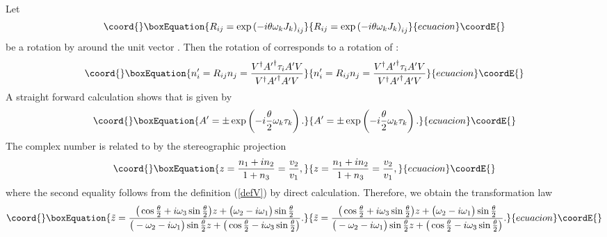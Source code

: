 \documentclass[a4paper,12pt]{article}
\begin{document}
Let
%
\begin{equation}\coord{}\boxEquation{
R_{ij} = \exp\left(-i \theta \omega_k J_k \right)_{ij}
}{
R_{ij} = \exp\left(-i \theta \omega_k J_k \right)_{ij}
}{ecuacion}\coordE{}\end{equation}
%
be a rotation by \myHighlight{$\theta$}\coordHE{} around the unit vector \coordHE{}. Then the 
rotation of \coordHE{} corresponds to a \coordHE{} rotation \coordHE{} of \coordHE{}: 
%
\begin{equation}\coord{}\boxEquation{
n_i^\prime = R_{ij} n_j 
= \frac{V^\dagger {A^\prime}^\dagger \tau_i A^\prime V}{V^\dagger 
{A^\prime}^\dagger A^\prime V} 
}{
n_i^\prime = R_{ij} n_j 
= \frac{V^\dagger {A^\prime}^\dagger \tau_i A^\prime V}{V^\dagger 
{A^\prime}^\dagger A^\prime V} 
}{ecuacion}\coordE{}\end{equation}
%
A straight forward calculation shows that \coordHE{} is given by
%
\begin{equation}\coord{}\boxEquation{
A^\prime = \pm \exp\left(-i \frac{\theta}{2} \omega_k \tau_k \right).
}{
A^\prime = \pm \exp\left(-i \frac{\theta}{2} \omega_k \tau_k \right).
}{ecuacion}\coordE{}\end{equation}
%
The complex number \coordHE{} is related to \coordHE{} by the stereographic 
projection
%
\begin{equation}\coord{}\boxEquation{
z = \frac{n_1 + i n_2}{1+n_3} = \frac{v_2}{v_1},
}{
z = \frac{n_1 + i n_2}{1+n_3} = \frac{v_2}{v_1},
}{ecuacion}\coordE{}\end{equation}
%
where the second equality follows from the definition (\ref{defV}) by 
direct calculation. Therefore, we obtain the transformation law 
%
\begin{equation}\coord{}\boxEquation{
{\tilde z} = \frac{\big( \cos \frac{\theta}{2} + i \omega_3 \sin
\frac{\theta}{2} \big) z + \big(\omega_2 - i \omega_1 \big) \sin
\frac{\theta}{2}} 
{\big(-\omega_2 - i \omega_1 \big) \sin
\frac{\theta}{2} z +\big( \cos \frac{\theta}{2} - i \omega_3 \sin
\frac{\theta}{2} \big)}.
}{
{\tilde z} = \frac{\big( \cos \frac{\theta}{2} + i \omega_3 \sin
\frac{\theta}{2} \big) z + \big(\omega_2 - i \omega_1 \big) \sin
\frac{\theta}{2}} 
{\big(-\omega_2 - i \omega_1 \big) \sin
\frac{\theta}{2} z +\big( \cos \frac{\theta}{2} - i \omega_3 \sin
\frac{\theta}{2} \big)}.
}{ecuacion}\coordE{}\end{equation}
%
\end{document}
